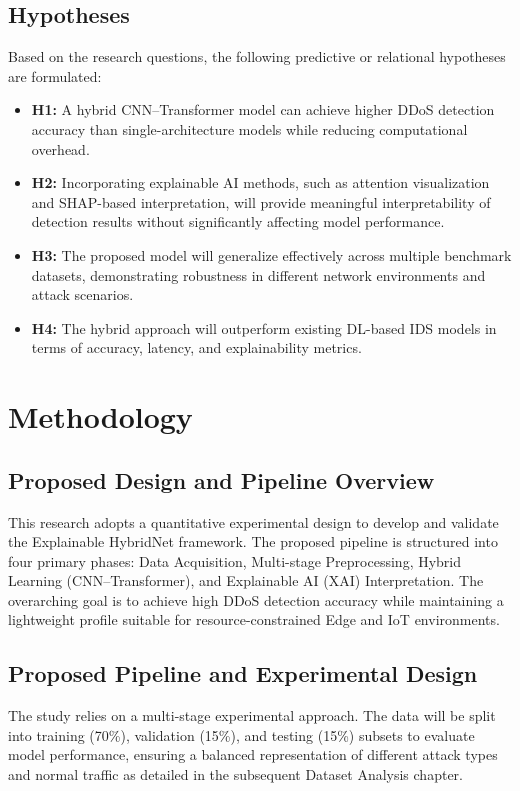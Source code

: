 \documentclass[12pt, a4paper]{report}
\begin{document}
\section{Hypotheses}
Based on the research questions, the following predictive or relational hypotheses are formulated:

\begin{itemize}
    \item \textbf{H1:} A hybrid CNN--Transformer model can achieve higher DDoS detection accuracy than single-architecture models while reducing computational overhead.
    \item \textbf{H2:} Incorporating explainable AI methods, such as attention visualization and SHAP-based interpretation, will provide meaningful interpretability of detection results without significantly affecting model performance.
    \item \textbf{H3:} The proposed model will generalize effectively across multiple benchmark datasets, demonstrating robustness in different network environments and attack scenarios.
    \item \textbf{H4:} The hybrid approach will outperform existing DL-based IDS models in terms of accuracy, latency, and explainability metrics.
\end{itemize}


\chapter{Methodology}
\section{Proposed Design and Pipeline Overview}
This research adopts a quantitative experimental design to develop and validate the Explainable HybridNet framework. The proposed pipeline is structured into four primary phases: Data Acquisition, Multi-stage Preprocessing, Hybrid Learning (CNN--Transformer), and Explainable AI (XAI) Interpretation. The overarching goal is to achieve high DDoS detection accuracy while maintaining a lightweight profile suitable for resource-constrained Edge and IoT environments.


 \section{Proposed Pipeline and Experimental Design}
 The study relies on a multi-stage experimental approach. The data will be split into training (70\%), validation (15\%), and testing (15\%) subsets to evaluate model performance, ensuring a balanced representation of different attack types and normal traffic as detailed in the subsequent Dataset Analysis chapter.
\end{document}
